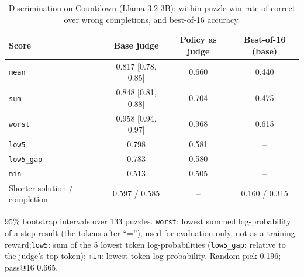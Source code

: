 \begin{table}[H]
\centering
\caption{Discrimination on Countdown (Llama-3.2-3B): within-puzzle win rate of correct over wrong completions, and best-of-16 accuracy.}
\label{tab:disc-countdown}
\begin{threeparttable}
\begin{tabular}{lccc}
\toprule
Score & Base judge & Policy as judge & Best-of-16 (base) \\
\midrule
\texttt{mean} & 0.817 [0.78, 0.85] & 0.660 & 0.440 \\
\texttt{sum}  & 0.848 [0.81, 0.88] & 0.704 & 0.475 \\
\texttt{worst} & 0.958 [0.94, 0.97] & 0.968 & 0.615 \\
\texttt{low5} & 0.798 & 0.581 & -- \\
\texttt{low5\_gap} & 0.783 & 0.580 & -- \\
\texttt{min} & 0.513 & 0.505 & -- \\
Shorter solution / completion & 0.597 / 0.585 & -- & 0.160 / 0.315 \\
\bottomrule
\end{tabular}
\begin{tablenotes}\footnotesize
\item 95\% bootstrap intervals over 133 puzzles. \texttt{worst}: lowest summed log-probability of a step result (the tokens after ``=''), used for evaluation only, not as a training reward;\texttt{low5}: sum of the 5 lowest token log-probabilities (\texttt{low5\_gap}: relative to the judge's top token); \texttt{min}: lowest token log-probability. Random pick 0.196; pass@16 0.665.
\end{tablenotes}
\end{threeparttable}
\end{table}
